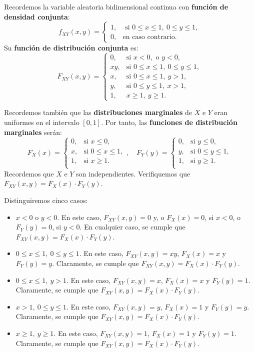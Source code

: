 \documentclass[]{book}
\begin{document}
Recordemos la variable aleatoria bidimensional continua con \textbf{función de densidad conjunta}:
\[
f_{XY}(x,y)=\begin{cases}
1, & \mbox{ si }0\leq x\leq 1,\ 0\leq y\leq 1, \\
0, & \mbox{en caso contrario.}
\end{cases}
\]
Su \textbf{función de distribución conjunta} es:
\[
F_{XY}(x,y)=\begin{cases}
0, & \mbox{si }x<0,\mbox{ o }y<0,\\
xy, & \mbox{si }0\leq x\leq 1,\ 0\leq y\leq 1, \\
x, & \mbox{si }0\leq x\leq 1,\ y> 1, \\
y, & \mbox{si }0\leq y\leq 1,\ x> 1, \\
1, & x\geq 1,\ y\geq 1.
\end{cases}
\]

Recordemos también que las \textbf{distribuciones marginales} de \(X\) e \(Y\) eran uniformes en el intervalo \([0,1]\). Por tanto, las \textbf{funciones de distribución marginales} serán:
\[
F_X(x)=\begin{cases}
0, & \mbox{si }x\leq 0, \\
x, & \mbox{si }0\leq x\leq 1, \\
1, & \mbox{si }x\geq 1. \\
\end{cases},\quad 
F_Y(y)=\begin{cases}
0, & \mbox{si }y\leq 0, \\
y, & \mbox{si }0\leq y\leq 1, \\
1, & \mbox{si }y\geq 1. \\
\end{cases}
\]
Recordemos que \(X\) e \(Y\) son independientes. Verifiquemos que \(F_{XY}(x,y)=F_X(x)\cdot F_Y(y)\).

Distinguiremos cinco casos:

\begin{itemize}
\item
  \(x<0\) o \(y<0\). En este caso, \(F_{XY}(x,y)=0\) y, o \(F_X(x)=0\), si \(x<0\), o \(F_Y(y)=0\), si \(y<0\). En cualquier caso, se cumple que \(F_{XY}(x,y)=F_X(x)\cdot F_Y(y)\).
\item
  \(0\leq x\leq 1,\ 0\leq y\leq 1\). En este caso, \(F_{XY}(x,y)=xy\), \(F_X(x)=x\) y \(F_Y(y)=y\). Claramente, se cumple que \(F_{XY}(x,y)=F_X(x)\cdot F_Y(y)\).
\item
  \(0\leq x\leq 1,\ y> 1\). En este caso, \(F_{XY}(x,y)=x\), \(F_X(x)=x\) y \(F_Y(y)=1\). Claramente, se cumple que \(F_{XY}(x,y)=F_X(x)\cdot F_Y(y)\).
\item
  \(x >1,\ 0\leq y\leq 1\). En este caso, \(F_{XY}(x,y)=y\), \(F_X(x)=1\) y \(F_Y(y)=y\). Claramente, se cumple que \(F_{XY}(x,y)=F_X(x)\cdot F_Y(y)\).
\item
  \(x\geq 1,\ y\geq 1\). En este caso, \(F_{XY}(x,y)=1\), \(F_X(x)=1\) y \(F_Y(y)=1\). Claramente, se cumple que \(F_{XY}(x,y)=F_X(x)\cdot F_Y(y)\).
\end{itemize}
\end{document}
